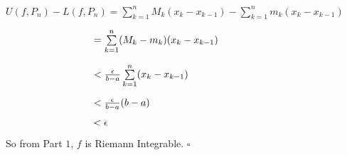 \documentclass{article}
\begin{document}
\begin{enumerate}
    $U(f, P_n) - L(f, P_n) = \sum\limits^n_{k=1} M_k (x_k - x_{k-1})- \sum\limits^n_{k=1} m_k (x_k - x_{k-1}) $

    $\hspace{3.1cm} = \sum\limits^n_{k=1} (M_k - m_k) (x_k - x_{k-1})$

    $\hspace{3.1cm}< \frac{\epsilon}{b-a} \sum\limits^n_{k=1} (x_k - x_{k-1}) $
    
    $\hspace{3.1cm}< \frac{\epsilon}{b-a} (b-a) $

    $\hspace{3.1cm}< \epsilon$

    So from Part $1$, $f$ is Riemann Integrable. $\square$
\end{enumerate}
\end{document}

